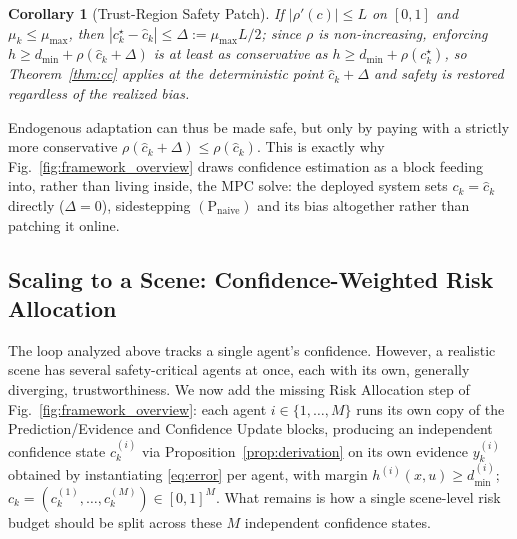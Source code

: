 \documentclass[letterpaper, 10 pt, conference]{ieeeconf}
\newtheorem{corollary}{Corollary}
\begin{document}
\begin{corollary}[Trust-Region Safety Patch]
\label{cor:patch}
If $|\rho'(c)|\le L$ on $[0,1]$ and $\mu_k\le\mu_{\max}$, then $|c_k^\star-\hat c_k|\le\Delta:=\mu_{\max}L/2$; since $\rho$ is non-increasing, enforcing $h\ge d_{\min}+\rho(\hat c_k+\Delta)$ is at least as conservative as $h\ge d_{\min}+\rho(c_k^\star)$, so Theorem~\ref{thm:cc} applies at the deterministic point $\hat c_k+\Delta$ and safety is restored regardless of the realized bias.
\end{corollary}

Endogenous adaptation can thus be made safe, but only by paying with a strictly more conservative $\rho(\hat c_k+\Delta)\le\rho(\hat c_k)$. This is exactly why Fig.~\ref{fig:framework_overview} draws confidence estimation as a block feeding into, rather than living inside, the MPC solve: the deployed system sets $c_k=\hat c_k$ directly ($\Delta=0$), sidestepping $(\mathrm P_{\mathrm{naive}})$ and its bias altogether rather than patching it online.

\subsection{Scaling to a Scene: Confidence-Weighted Risk Allocation}
\label{sec:multiagent}

The loop analyzed above tracks a single agent's confidence. However, a realistic scene has several safety-critical agents at once, each with its own, generally diverging, trustworthiness. We now add the missing Risk Allocation step of Fig.~\ref{fig:framework_overview}: each agent $i\in\{1,\dots,M\}$ runs its own copy of the Prediction/Evidence and Confidence Update blocks, producing an independent confidence state $c_k^{(i)}$ via Proposition~\ref{prop:derivation} on its own evidence $y_k^{(i)}$ obtained by instantiating \eqref{eq:error} per agent, with margin $h^{(i)}(x,u)\ge d_{\min}^{(i)}$; $c_k=(c_k^{(1)},\dots,c_k^{(M)})\in[0,1]^M$. What remains is how a single scene-level risk budget should be split across these $M$ independent confidence states.
\end{document}
